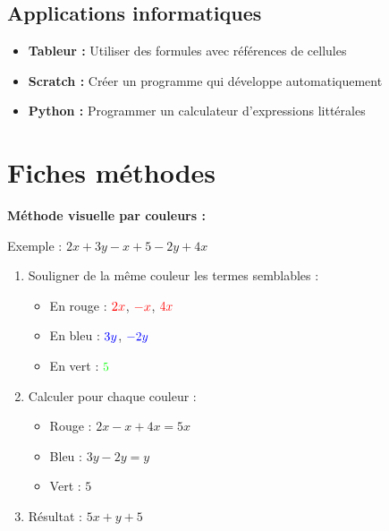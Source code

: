 \subsection{Applications informatiques}
\begin{itemize}
	\item \textbf{Tableur :} Utiliser des formules avec références de cellules
	\item \textbf{Scratch :} Créer un programme qui développe automatiquement
	\item \textbf{Python :} Programmer un calculateur d'expressions littérales
\end{itemize}

\section{Fiches méthodes}

\begin{methodebox}
	\textbf{Méthode visuelle par couleurs :}
	
	Exemple : $2x + 3y - x + 5 - 2y + 4x$
	
	\begin{enumerate}
		\item Souligner de la même couleur les termes semblables :
		\begin{itemize}
			\item En rouge : $\textcolor{red}{2x}$, $\textcolor{red}{-x}$, $\textcolor{red}{4x}$
			\item En bleu : $\textcolor{blue}{3y}$, $\textcolor{blue}{-2y}$
			\item En vert : $\textcolor{green}{5}$
		\end{itemize}
		\item Calculer pour chaque couleur :
		\begin{itemize}
			\item Rouge : $2x - x + 4x = 5x$
			\item Bleu : $3y - 2y = y$
			\item Vert : $5$
		\end{itemize}
		\item Résultat : $5x + y + 5$
	\end{enumerate}
\end{methodebox}


